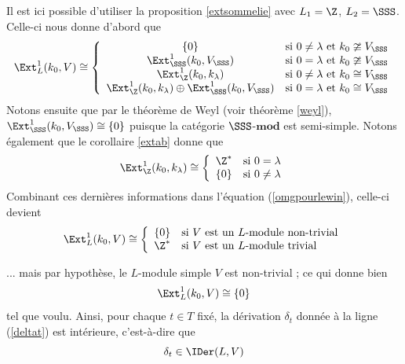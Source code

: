 \begin{Prop}
\begin{pre}
Il est ici possible d'utiliser la proposition \ref{extsommelie} avec $L_1 = \Z$, $L_2 = \SSS$. Celle-ci nous donne d'abord que
\begin{equation} \label{omgpourlewin}
\Ext_{L}^1(k_0, V) \cong \left\{
\begin{array}{cl} \{0\} & \text{si } 0 \neq \lambda \text{ et } k_0 \ncong V_\SSS \\
\Ext_\SSS^1(k_0,V_\SSS) & \text{si } 0 = \lambda \text{ et } k_0 \ncong V_\SSS \\
\Ext_\Z^1(k_0,k_\lambda) & \text{si } 0 \neq \lambda \text{ et } k_0 \cong V_\SSS \\
\Ext_\Z^1(k_0,k_\lambda) \oplus \Ext_\SSS^1(k_0,V_\SSS) & \text{si } 0 = \lambda \text{ et } k_0 \cong V_\SSS
\end{array} \right.
\end{equation}
Notons ensuite que par le théorème de Weyl (voir théorème \ref{weyl}), $\Ext_\SSS^1(k_0,V_\SSS) \cong \{0\}$ puisque la catégorie $\SSS$-$\mathbf{mod}$ est semi-simple. Notons également que le corollaire \ref{extab} donne que 
$$ \Ext_\Z^1(k_0,k_\lambda) \cong \left\{\begin{array}{cl} \Z^* & \text{si } 0 = \lambda \\ \{0\} & \text{si } 0 \neq \lambda\end{array}\right. $$
Combinant ces dernières informations dans l'équation (\ref{omgpourlewin}), celle-ci devient
\begin{equation} \label{omgpourlewinv2}
\Ext_{L}^1(k_0, V) \cong \left\{
\begin{array}{cl} \{0\} & \text{si } V \text{ est un } L\text{-module non-trivial} \\
\Z^* & \text{si } V \text{ est un } L\text{-module trivial}
\end{array} \right.
\end{equation}

... mais par hypothèse, le $L$-module simple $V$ est non-trivial ; ce qui donne bien 
$$ \Ext_{L}^1(k_0, V) \cong \{0\} $$ 
tel que voulu. Ainsi, pour chaque $t \in T$ fixé, la dérivation $\delta_t$ donnée à la ligne (\ref{deltat}) est intérieure, c'est-à-dire que 
$$ \delta_t \in \IDer(L,V) $$


\end{pre}
\end{Prop}
